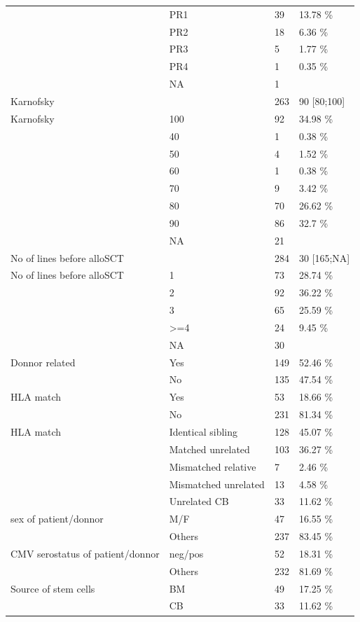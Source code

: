 \documentclass[a4paper,11pt] {article}
\begin{document}
\begin{longtable}{llll}
   & PR1 & 39 & 13.78 \% \\ 
   & PR2 & 18 & 6.36 \% \\ 
   & PR3 & 5 & 1.77 \% \\ 
   & PR4 & 1 & 0.35 \% \\ 
   & NA & 1 &  \\ 
  Karnofsky &  & 263 & 90 [80;100] \\ 
  Karnofsky & 100 & 92 & 34.98 \% \\ 
   & 40 & 1 & 0.38 \% \\ 
   & 50 & 4 & 1.52 \% \\ 
   & 60 & 1 & 0.38 \% \\ 
   & 70 & 9 & 3.42 \% \\ 
   & 80 & 70 & 26.62 \% \\ 
   & 90 & 86 & 32.7 \% \\ 
   & NA & 21 &  \\ 
  No of lines before alloSCT &  & 284 & 30 [165;NA] \\ 
  No of lines before alloSCT & 1 & 73 & 28.74 \% \\ 
   & 2 & 92 & 36.22 \% \\ 
   & 3 & 65 & 25.59 \% \\ 
   & >=4 & 24 & 9.45 \% \\ 
   & NA & 30 &  \\ 
  Donnor related & Yes & 149 & 52.46 \% \\ 
   & No & 135 & 47.54 \% \\ 
  HLA match & Yes & 53 & 18.66 \% \\ 
   & No & 231 & 81.34 \% \\ 
  HLA match & Identical sibling & 128 & 45.07 \% \\ 
   & Matched unrelated & 103 & 36.27 \% \\ 
   & Mismatched relative & 7 & 2.46 \% \\ 
   & Mismatched unrelated & 13 & 4.58 \% \\ 
   & Unrelated CB & 33 & 11.62 \% \\ 
  sex of patient/donnor & M/F & 47 & 16.55 \% \\ 
   & Others & 237 & 83.45 \% \\ 
  CMV serostatus of patient/donnor & neg/pos & 52 & 18.31 \% \\ 
   & Others & 232 & 81.69 \% \\ 
  Source of stem cells & BM & 49 & 17.25 \% \\ 
   & CB & 33 & 11.62 \% \\ 

\end{longtable}
\end{document}
